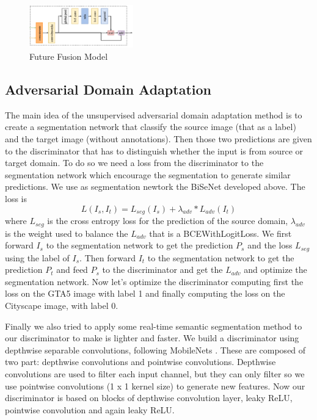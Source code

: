 \documentclass[conference]{IEEEtran}
\begin{document}
\begin{figure}[tp]
\centerline{\includegraphics[width=0.4\textwidth]{figures/FFM.pdf.png}}
\caption{Future Fusion Model}
\label{fig:ffm}
\end{figure}

\subsection{Adversarial Domain Adaptation}

The main idea of the unsupervised adversarial domain adaptation method \cite{b3} is to create a segmentation network that classify the source
image (that as a label) and the target image (without annotations). Then those two predictions are given to the discriminator that
has to distinguish whether the input is from source or target domain. To do so we need a loss from the discriminator to the 
segmentation network which encourage the segmentation to generate similar predictions. We use as segmentation newtork the BiSeNet
developed above. The loss is 
\[L(I_s,I_t) = L_{seg}(I_s) + \lambda_{adv}*L_{adv}(I_t)\]
where \(L_{seg}\) is the cross entropy loss for the prediction of the source domain, \(\lambda_{adv}\) is the weight used to 
balance the \(L_{adv}\) that is a BCEWithLogitLoss.
We first forward \(I_s\) to the segmentation network to get the prediction \(P_s\) and the loss \(L_{seg}\) using the label of \(I_s\).
Then forward \(I_t\) to the segmentation network to get the prediction \(P_t\) and feed \(P_s\) to the discriminator and get the
\(L_{adv}\) and optimize the segmentation network. Now let's optimize the discriminator computing first the loss on the GTA5 image
with label 1 and finally computing the loss on the Cityscape image, with label 0. 

Finally we also tried to apply some real-time semantic segmentation method to our discriminator to make is lighter and faster.
We build a discriminator using depthwise separable convolutions, following MobileNets \cite{b6}. These are composed of two part: 
depthwise convolutions and pointwise convolutions. Depthwise convolutions are used to filter each input channel, but they can
only filter so we use pointwise convolutions (1 x 1 kernel size) to generate new features. Now our discriminator is based on blocks of
depthwise convolution layer, leaky ReLU, pointwise convolution and again leaky ReLU.
\end{document}
